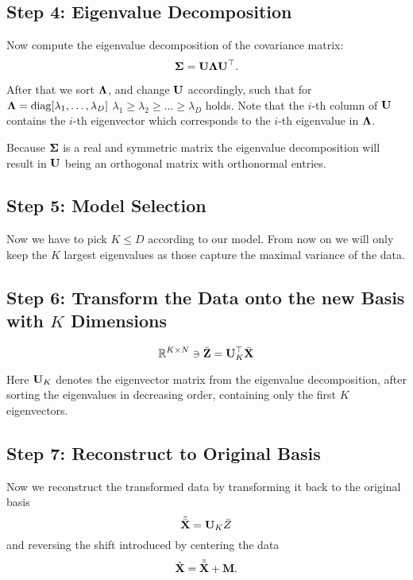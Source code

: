 
\subsection{Step 4: Eigenvalue Decomposition}
Now compute the eigenvalue decomposition of the covariance matrix: \[
\mathbf{\Sigma} = \mathbf{U \Lambda U}^\top.
\]

After that we sort \(\mathbf{\Lambda}\), and change \(\mathbf{U}\) accordingly, such that for \(\mathbf{\Lambda} = \operatorname{diag}[\lambda_1, \ldots, \lambda_D]\) \(\lambda_1 \geq \lambda_2 \geq \ldots \geq \lambda_D\) holds. Note that the \(i\)-th column of \(\mathbf{U}\) contains the \(i\)-th eigenvector which corresponds to the \(i\)-th eigenvalue in \(\mathbf{\Lambda}\).

Because \(\mathbf{\Sigma}\) is a real and symmetric matrix the eigenvalue decomposition will result in \(\mathbf{U}\) being an orthogonal matrix with orthonormal entries.


\subsection{Step 5: Model Selection}
Now we have to pick \(K \leq D\) according to our model. From now on we will only keep the \(K\) largest eigenvalues as those capture the maximal variance of the data.

\subsection{Step 6: Transform the Data onto the new Basis with \(K\) Dimensions}
\[
\mathbb{R}^{K \times N} \ni \bar{\mathbf{Z}} = \mathbf{U}_K^\top \bar{\mathbf{X}}
\]

Here \(\mathbf{U}_K\) denotes the eigenvector matrix from the eigenvalue decomposition, after sorting the eigenvalues in decreasing order, containing only the first \(K\) eigenvectors.

\subsection{Step 7: Reconstruct to Original Basis}
Now we reconstruct the transformed data by transforming it back to the original basis
\[
	\tilde{\bar{\mathbf{X}}} = \mathbf{U}_K \bar{Z}
\]
and reversing the shift introduced by centering the data
\[
	\tilde{\mathbf{X}} = \tilde{\bar{\mathbf{X}}} + \mathbf{M}.
\]